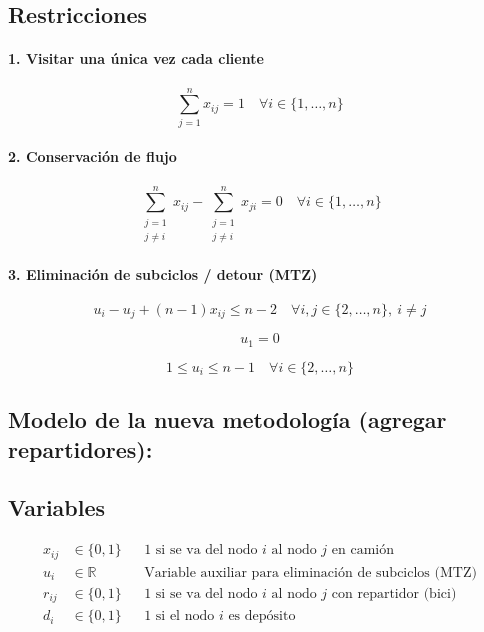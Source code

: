 \documentclass{article}
\begin{document}
\subsection*{Restricciones}

\paragraph{1. Visitar una única vez cada cliente}
\[
\sum_{j=1}^{n} x_{ij} = 1 \quad \forall i \in \{1, \dots, n\}
\]

\paragraph{2. Conservación de flujo}
\[
\sum_{\substack{j=1 \\ j \ne i}}^{n} x_{ij} - \sum_{\substack{j=1 \\ j \ne i}}^{n} x_{ji} = 0 \quad \forall i \in \{1, \dots, n\}
\]

\paragraph{3. Eliminación de subciclos / detour (MTZ)}
\[
u_i - u_j + (n - 1)x_{ij} \leq n - 2 \quad \forall i, j \in \{2, \dots, n\},\ i \ne j
\]

\[
u_1 = 0
\]

\[
1 \leq u_i \leq n - 1 \quad \forall i \in \{2, \dots, n\}
\]

\subsection{Modelo de la nueva metodología (agregar repartidores):} \label{model_repartidores}
\subsection*{Variables}
\begin{align*}
    x_{ij} &\in \{0,1\} && \text{1 si se va del nodo } i \text{ al nodo } j \text{ en camión }\\
    u_i &\in \mathbb{R} && \text{Variable auxiliar para eliminación de subciclos (MTZ)} \\
    r_{ij} &\in \{0,1\} && \text{1 si se va del nodo } i \text{ al nodo } j \text{ con repartidor (bici) } \\
    d_{i} &\in \{0,1\} && \text{1 si el nodo $i$ es depósito } 
\end{align*}
\end{document}

